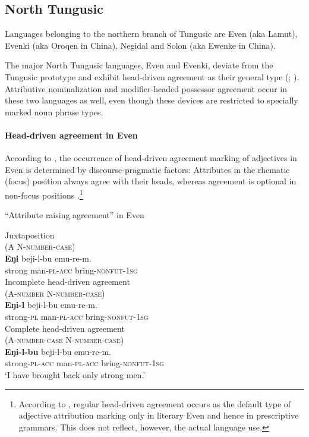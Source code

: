 \subsection{North Tungusic}
Languages belonging to the northern branch of Tungusic are Even (aka Lamut), Evenki (aka Oroqen in China), Negidal and Solon (aka Ewenke in China).

The major North Tungusic languages, Even and Evenki, deviate from the Tungusic prototype and exhibit head-driven agreement as their general type (\citealt[11]{malchukov1995}; \citealt[18]{bulatova-etal1999}). Attributive nominalization and modifier-headed possessor agreement occur in these two languages as well, even though these devices are restricted to specially marked noun phrase types.

\paragraph{Head-driven agreement in Even}
According to \citet[20]{malchukov1995}, the occurrence of head-driven agreement marking of adjectives in Even is determined by discourse-pragmatic factors: Attributes in the rhematic (focus) position always agree with their heads, whereas agreement is optional in non-focus positions \cite[31–32]{malchukov1995}.\footnote{According to \cite[31]{malchukov1995}, regular head-driven agreement occurs as the default type of adjective attribution marking only in literary Even and hence in prescriptive grammars. This does not reflect, however, the actual language use.}
\begin{exe}
\ex \label{even raising}
\rm{“Attribute raising agreement” in Even \cite[30–31]{malchukov1995}}
\begin{xlist}
\ex
\label{even juxt}
\rm{Juxtaposition}\\
\rm{(A N-\textsc{number}-\textsc{case})}\\
\gll	\textbf{Eŋi} beji-l-bu emu-re-m.\\
	strong man-\textsc{pl}-\textsc{acc} bring-\textsc{nonfut}-\textsc{1sg}\\

\ex
\label{even numagr}	
\rm{Incomplete head-driven agreement}\\
\rm{(A-\textsc{number} N-\textsc{number}-\textsc{case})}\\
\gll	\textbf{Eŋi-l} beji-l-bu emu-re-m.\\
	strong-\textsc{pl} man-\textsc{pl}-\textsc{acc} bring-\textsc{nonfut}-\textsc{1sg}\\

\ex
\label{even agr}	
\rm{Complete head-driven agreement}\\
\rm{(A-\textsc{number}-\textsc{case} N-\textsc{number}-\textsc{case})}\\
\gll	\textbf{Eŋi-l-bu} beji-l-bu emu-re-m.\\
	strong-\textsc{pl}-\textsc{acc} man-\textsc{pl}-\textsc{acc} bring-\textsc{nonfut}-\textsc{1sg}\\
\glt	‘I have brought back only strong men.’
\end{xlist}
\end{exe}
